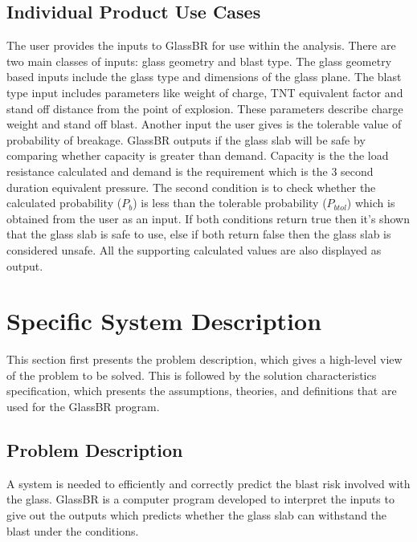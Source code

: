 \documentclass[12pt]{article}
\begin{document}
\subsection{Individual Product Use Cases}
\label{Sec:IndividualProdUC}
The user provides the inputs to GlassBR for use within the analysis. There are two main classes of inputs: glass geometry and blast type. The glass geometry based inputs include the glass type and dimensions of the glass plane. The blast type input includes parameters like weight of charge, TNT equivalent factor and stand off distance from the point of explosion. These parameters describe charge weight and stand off blast. Another input the user gives is the tolerable value of probability of breakage. GlassBR outputs if the glass slab will be safe by comparing whether capacity is greater than demand. Capacity is the the load resistance calculated and demand is the requirement which is the 3 second duration equivalent pressure. The second condition is to check whether the calculated probability (${P_{b}}$) is less than the tolerable probability (${P_{btol}}$) which is obtained from the user as an input. If both conditions return true then it's shown that the glass slab is safe to use, else if both return false then the glass slab is considered unsafe. All the supporting calculated values are also displayed as output.
\section{Specific System Description}
\label{Sec:SpecSystDesc}
This section first presents the problem description, which gives a high-level view of the problem to be solved. This is followed by the solution characteristics specification, which presents the assumptions, theories, and definitions that are used for the GlassBR program.
\subsection{Problem Description}
\label{Sec:ProbDesc}
A system is needed to efficiently and correctly predict the blast risk involved with the glass. GlassBR is a computer program developed to interpret the inputs to give out the outputs which predicts whether the glass slab can withstand the blast under the conditions.
\end{document}
